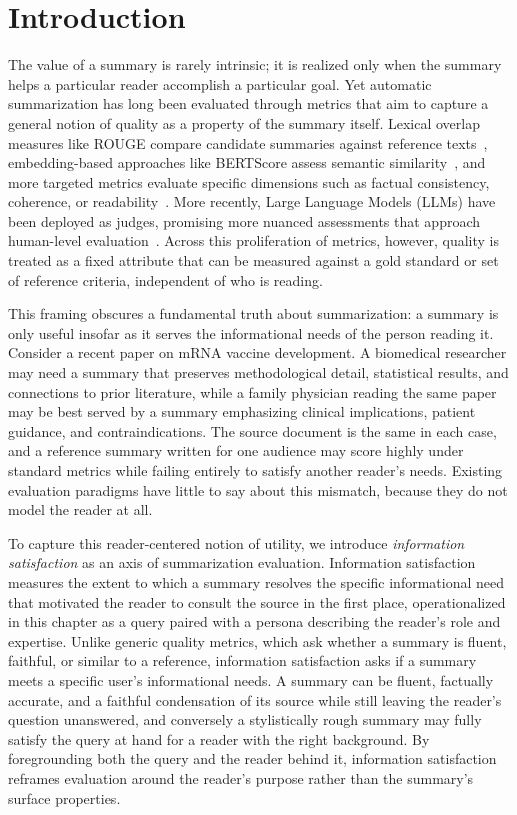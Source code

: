 \section{Introduction}

The value of a summary is rarely intrinsic; it is realized only when the summary helps a particular reader accomplish a particular goal. Yet automatic summarization has long been evaluated through metrics that aim to capture a general notion of quality as a property of the summary itself. Lexical overlap measures like ROUGE compare candidate summaries against reference texts~\cite{lin2004rouge}, embedding-based approaches like BERTScore assess semantic similarity~\cite{zhang2020bertscore}, and more targeted metrics evaluate specific dimensions such as factual consistency, coherence, or readability~\cite{kryscinski2019neural, wang2020asking, fabbri2021summeval, luo2022readability}. More recently, Large Language Models (LLMs) have been deployed as judges, promising more nuanced assessments that approach human-level evaluation~\cite{zheng2023judging,liu2023geval}. Across this proliferation of metrics, however, quality is treated as a fixed attribute that can be measured against a gold standard or set of reference criteria, independent of who is reading.

This framing obscures a fundamental truth about summarization: a summary is only useful insofar as it serves the informational needs of the person reading it. Consider a recent paper on mRNA vaccine development. A biomedical researcher may need a summary that preserves methodological detail, statistical results, and connections to prior literature, while a family physician reading the same paper may be best served by a summary emphasizing clinical implications, patient guidance, and contraindications. The source document is the same in each case, and a reference summary written for one audience may score highly under standard metrics while failing entirely to satisfy another reader's needs. Existing evaluation paradigms have little to say about this mismatch, because they do not model the reader at all.

To capture this reader-centered notion of utility, we introduce \textit{information satisfaction} as an axis of summarization evaluation. Information satisfaction measures the extent to which a summary resolves the specific informational need that motivated the reader to consult the source in the first place, operationalized in this chapter as a query paired with a persona describing the reader's role and expertise. Unlike generic quality metrics, which ask whether a summary is fluent, faithful, or similar to a reference, information satisfaction asks if a summary meets a specific user's informational needs.
A summary can be fluent, factually accurate, and a faithful condensation of its source while still leaving the reader's question unanswered, and conversely a stylistically rough summary may fully satisfy the query at hand for a reader with the right background. By foregrounding both the query and the reader behind it, information satisfaction reframes evaluation around the reader's purpose rather than the summary's surface properties.

